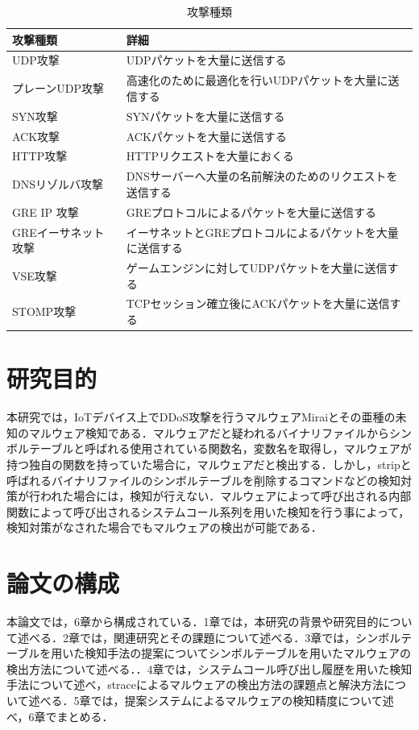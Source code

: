 \begin{table}[h]
   \caption{攻撃種類}
   \centering
   \label{tab:attack}
   \begin{tabular}{|l|l|}
   \hline
   攻撃種類                            & 詳細 \\ \hline \hline
   UDP攻撃                           &   UDPパケットを大量に送信する \\ \hline
   プレーンUDP攻撃                    & 高速化のために最適化を行いUDPパケットを大量に送信する   \\ \hline
   SYN攻撃                           &  SYNパケットを大量に送信する  \\ \hline
   ACK攻撃                           &  ACKパケットを大量に送信する  \\ \hline
   HTTP攻撃                          &  HTTPリクエストを大量におくる  \\ \hline
   DNSリゾルバ攻撃                       &  DNSサーバーへ大量の名前解決のためのリクエストを送信する  \\ \hline
   GRE IP 攻撃                       &  GREプロトコルによるパケットを大量に送信する  \\ \hline
   GREイーサネット攻撃                     &  イーサネットとGREプロトコルによるパケットを大量に送信する  \\ \hline
   VSE攻撃                           &  ゲームエンジンに対してUDPパケットを大量に送信する  \\ \hline
   STOMP攻撃                         &  TCPセッション確立後にACKパケットを大量に送信する  \\ \hline
   \end{tabular}
\end{table}


\section{研究目的}
本研究では，IoTデバイス上でDDoS攻撃を行うマルウェアMiraiとその亜種の未知のマルウェア検知である．マルウェアだと疑われるバイナリファイルからシンボルテーブルと呼ばれる使用されている関数名，変数名を取得し，マルウェアが持つ独自の関数を持っていた場合に，マルウェアだと検出する．しかし，stripと呼ばれるバイナリファイルのシンボルテーブルを削除するコマンドなどの検知対策が行われた場合には，検知が行えない．マルウェアによって呼び出される内部関数によって呼び出されるシステムコール系列を用いた検知を行う事によって，検知対策がなされた場合でもマルウェアの検出が可能である．

\section{論文の構成}
本論文では，6章から構成されている．1章では，本研究の背景や研究目的について述べる．2章では，関連研究とその課題について述べる．3章では，シンボルテーブルを用いた検知手法の提案についてシンボルテーブルを用いたマルウェアの検出方法について述べる．．4章では，システムコール呼び出し履歴を用いた検知手法について述べ，straceによるマルウェアの検出方法の課題点と解決方法について述べる．5章では，提案システムによるマルウェアの検知精度について述べ，6章でまとめる．